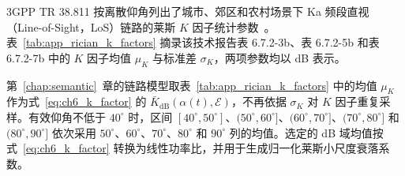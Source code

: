 3GPP TR 38.811 按离散仰角列出了城市、郊区和农村场景下 Ka 频段直视（Line-of-Sight，LoS）链路的莱斯 $K$ 因子统计参数~\cite{3gpp-38811}。表~\ref{tab:app_rician_k_factors} 摘录该技术报告表 6.7.2-3b、表 6.7.2-5b 和表 6.7.2-7b 中的 $K$ 因子均值 $\mu_K$ 与标准差 $\sigma_K$，两项参数均以 dB 表示。

\begin{table}[!htp]
    \centering
    \label{tab:app_rician_k_factors}
    \scriptsize
    \setlength{\tabcolsep}{2.8pt}
    \renewcommand{\arraystretch}{1.15}
\end{table}

第~\ref{chap:semantic}~章的链路模型取表~\ref{tab:app_rician_k_factors} 中的均值 $\mu_K$ 作为式~\eqref{eq:ch6_k_factor} 的 $\bar K_{\mathrm{dB}}(\alpha(t),\mathcal E)$，不再依据 $\sigma_K$ 对 $K$ 因子重复采样。有效仰角不低于 $40^\circ$ 时，区间 $[40^\circ,50^\circ]$、$(50^\circ,60^\circ]$、$(60^\circ,70^\circ]$、$(70^\circ,80^\circ]$ 和 $(80^\circ,90^\circ]$ 依次采用 $50^\circ$、$60^\circ$、$70^\circ$、$80^\circ$ 和 $90^\circ$ 列的均值。选定的 dB 域均值按式~\eqref{eq:ch6_k_factor} 转换为线性功率比，并用于生成归一化莱斯小尺度衰落系数。

